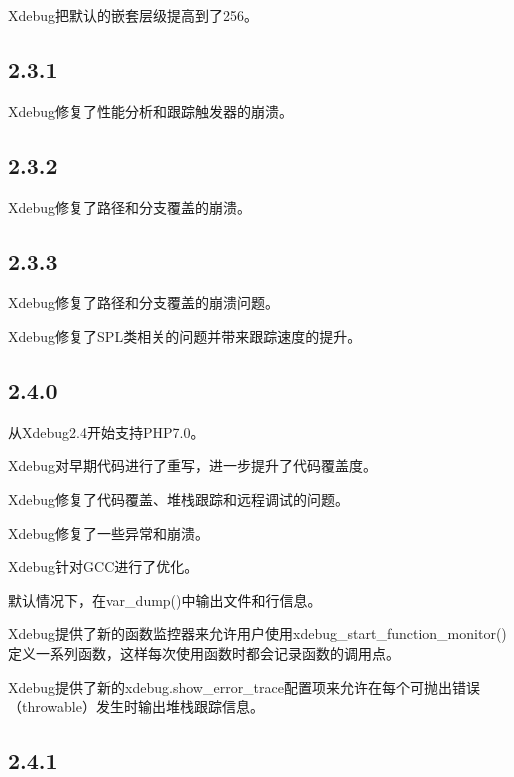 Xdebug把默认的嵌套层级提高到了256。

\subsection{2.3.1}


Xdebug修复了性能分析和跟踪触发器的崩溃。


\subsection{2.3.2}

Xdebug修复了路径和分支覆盖的崩溃。

\subsection{2.3.3}



\begin{compactitem}
\item Xdebug修复了路径和分支覆盖的崩溃问题。
\item Xdebug修复了SPL类相关的问题并带来跟踪速度的提升。
\end{compactitem}

\subsection{2.4.0}


从Xdebug2.4开始支持PHP7.0。

\begin{compactitem}
\item Xdebug对早期代码进行了重写，进一步提升了代码覆盖度。
\item Xdebug修复了代码覆盖、堆栈跟踪和远程调试的问题。
\item Xdebug修复了一些异常和崩溃。
\item Xdebug针对GCC进行了优化。
\end{compactitem}

默认情况下，在var\_dump()中输出文件和行信息。

Xdebug提供了新的函数监控器来允许用户使用xdebug\_start\_function\_monitor()定义一系列函数，这样每次使用函数时都会记录函数的调用点。

Xdebug提供了新的xdebug.show\_error\_trace配置项来允许在每个可抛出错误（throwable）发生时输出堆栈跟踪信息。


\subsection{2.4.1}

